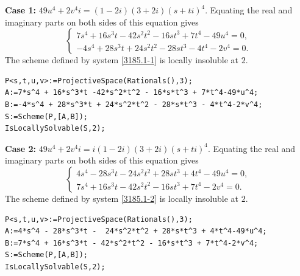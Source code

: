 \documentclass[a4paper,12pt,english,reqno]{amsart}
\begin{document}
{\bf Case 1:} $49u^4+2v^4i=(1-2i)(3+2i)(s+ti)^4$. Equating the real and imaginary parts on both sides of this equation gives
\begin{equation}\label{3185.1-1}
\begin{cases}
7s^4 + 16s^3t - 42s^2t^2 - 16st^3 + 7t^4 - 49u^4=0,\\
-4s^4 + 28s^3t + 24s^2t^2 - 28st^3 - 4t^4 - 2v^4=0.
\end{cases}
\end{equation}
The scheme defined by system \eqref{3185.1-1} is locally insoluble at $2$.
\begin{lstlisting}
P<s,t,u,v>:=ProjectiveSpace(Rationals(),3);
A:=7*s^4 + 16*s^3*t -42*s^2*t^2 - 16*s*t^3 + 7*t^4-49*u^4;
B:=-4*s^4 + 28*s^3*t + 24*s^2*t^2 - 28*s*t^3 - 4*t^4-2*v^4;
S:=Scheme(P,[A,B]);
IsLocallySolvable(S,2);
\end{lstlisting}

{\bf Case 2:} $49u^4+2v^4i=i(1-2i)(3+2i)(s+ti)^4$. Equating the real and imaginary parts on both sides of this equation gives
\begin{equation}\label{3185.1-2}
\begin{cases}
4s^4 - 28s^3t - 24s^2t^2 + 28st^3 + 4t^4 - 49u^4=0,\\
7s^4 + 16s^3t - 42s^2t^2 - 16st^3 + 7t^4 - 2v^4=0.
\end{cases}
\end{equation}
The scheme defined by system \eqref{3185.1-2} is locally insoluble at $2$.

\begin{lstlisting}
P<s,t,u,v>:=ProjectiveSpace(Rationals(),3);
A:=4*s^4 - 28*s^3*t -  24*s^2*t^2 + 28*s*t^3 + 4*t^4-49*u^4;
B:=7*s^4 + 16*s^3*t - 42*s^2*t^2 - 16*s*t^3 + 7*t^4-2*v^4;
S:=Scheme(P,[A,B]);
IsLocallySolvable(S,2);
\end{lstlisting}
\end{document}
